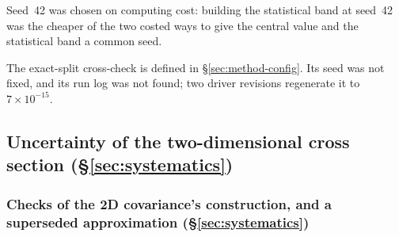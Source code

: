 Seed~42 was chosen on computing cost: building the statistical band at seed~42 was the cheaper of the two costed ways to give the central value and the statistical band a common seed.

The exact-split cross-check is defined in \S\ref{sec:method-config}. Its seed was not fixed, and its run log was not found; two driver revisions regenerate it to $7\times10^{-15}$.

\subsection{Uncertainty of the two-dimensional cross section (\S\ref{sec:systematics})}
\label{app:devhistory-systematics}

\subsubsection{Checks of the 2D covariance's construction, and a superseded approximation (\S\ref{sec:systematics})}
\label{app:devhistory-2dchecks}


